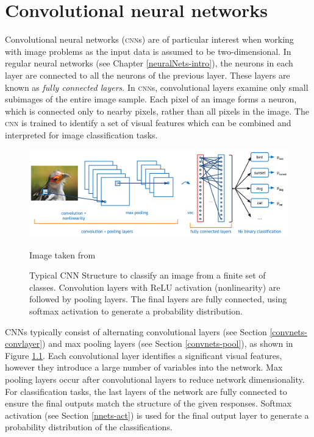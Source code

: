 %
%

\chapter{Convolutional neural networks}\label{convnets}

Convolutional neural networks (\textsc{cnn}s) are of particular interest when working with image problems as the input data is assumed to be two-dimensional. In regular neural networks (see Chapter \ref{neuralNets-intro}), the neurons in each layer are connected to all the neurons of the previous layer. These layers are known as \textit{fully connected layers}. In \textsc{cnn}s, convolutional layers examine only small subimages of the entire image sample. Each pixel of an image forms a neuron, which is connected only to nearby pixels, rather than all pixels in the image. The \textsc{cnn} is trained to identify a set of visual features which can be combined and interpreted for image classification tasks.

\begin{figure}[ht]
	\centering
	\includegraphics[width=\textwidth]{Images/4_cnn_structure.png}
	\caption{Typical CNN Structure to classify an image from a finite set of classes. Convolution layers with ReLU activation (nonlinearity) are followed by pooling layers. The final layers are fully connected, using softmax activation to generate a probability distribution.}
	\small Image taken from \cite{ADeshpande2016}
	\label{convnets-structurefig}
\end{figure}

CNNs typically consist of alternating convolutional layers (see Section \ref{convnets-convlayer}) and max pooling layers (see Section \ref{convnets-pool}), as shown in Figure \ref{convnets-structurefig}. Each convolutional layer identifies a significant visual features, however they introduce a large number of variables into the network. Max pooling layers occur after convolutional layers to reduce network dimensionality. For classification tasks, the last layers of the network are fully connected to ensure the final outputs match the structure of the given responses. Softmax activation (see Section \ref{nnets-act}) is used for the final output layer to generate a probability distribution of the classifications.

